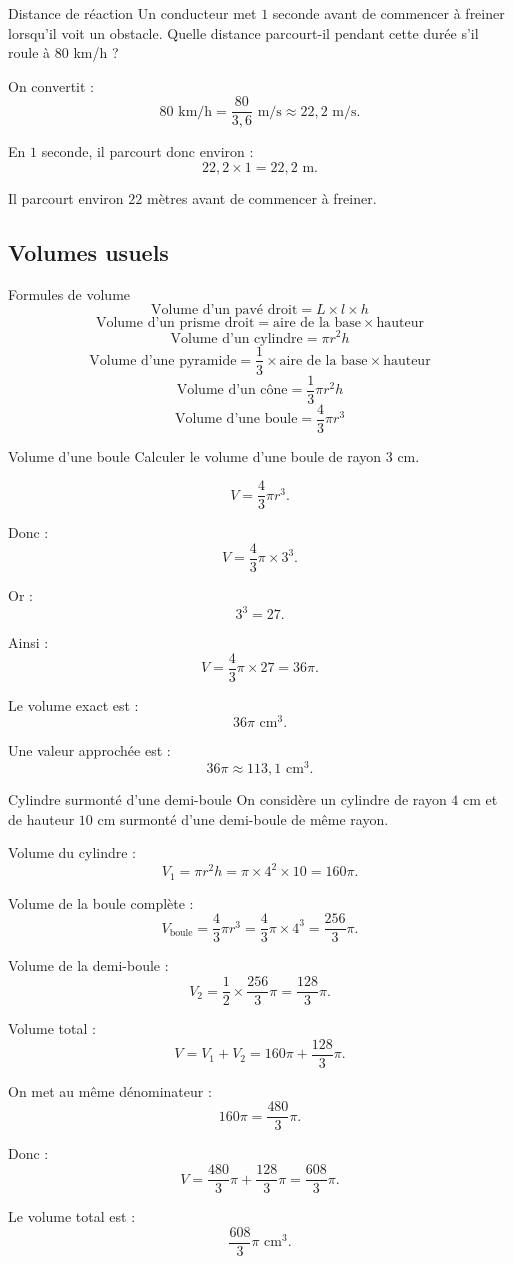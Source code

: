 \documentclass[11pt,a4paper]{article}
\begin{document}
\begin{examplebox}{Distance de réaction}
Un conducteur met $1$ seconde avant de commencer à freiner lorsqu'il voit un obstacle. Quelle distance parcourt-il pendant cette durée s'il roule à $80$ km/h ?

On convertit :
\[
80\text{ km/h}=\frac{80}{3{,}6}\text{ m/s}\approx 22{,}2\text{ m/s}.
\]

En $1$ seconde, il parcourt donc environ :
\[
22{,}2\times 1=22{,}2\text{ m}.
\]

Il parcourt environ $22$ mètres avant de commencer à freiner.
\end{examplebox}

\subsection{Volumes usuels}

\begin{retenirbox}{Formules de volume}
\[
\text{Volume d'un pavé droit}=L\times l\times h
\]
\[
\text{Volume d'un prisme droit}=\text{aire de la base}\times \text{hauteur}
\]
\[
\text{Volume d'un cylindre}=\pi r^2 h
\]
\[
\text{Volume d'une pyramide}=\frac{1}{3}\times \text{aire de la base}\times \text{hauteur}
\]
\[
\text{Volume d'un cône}=\frac{1}{3}\pi r^2 h
\]
\[
\text{Volume d'une boule}=\frac{4}{3}\pi r^3
\]
\end{retenirbox}

\begin{examplebox}{Volume d'une boule}
Calculer le volume d'une boule de rayon $3$ cm.

\[
V=\frac{4}{3}\pi r^3.
\]

Donc :
\[
V=\frac{4}{3}\pi \times 3^3.
\]

Or :
\[
3^3=27.
\]

Ainsi :
\[
V=\frac{4}{3}\pi \times 27=36\pi.
\]

Le volume exact est :
\[
36\pi\text{ cm}^3.
\]

Une valeur approchée est :
\[
36\pi\approx 113{,}1\text{ cm}^3.
\]
\end{examplebox}

\begin{examplebox}{Cylindre surmonté d'une demi-boule}
On considère un cylindre de rayon $4$ cm et de hauteur $10$ cm surmonté d'une demi-boule de même rayon.

Volume du cylindre :
\[
V_1=\pi r^2h=\pi\times 4^2\times 10=160\pi.
\]

Volume de la boule complète :
\[
V_{\text{boule}}=\frac{4}{3}\pi r^3=\frac{4}{3}\pi\times 4^3
=\frac{256}{3}\pi.
\]

Volume de la demi-boule :
\[
V_2=\frac{1}{2}\times \frac{256}{3}\pi=\frac{128}{3}\pi.
\]

Volume total :
\[
V=V_1+V_2=160\pi+\frac{128}{3}\pi.
\]

On met au même dénominateur :
\[
160\pi=\frac{480}{3}\pi.
\]

Donc :
\[
V=\frac{480}{3}\pi+\frac{128}{3}\pi=\frac{608}{3}\pi.
\]

Le volume total est :
\[
\frac{608}{3}\pi\text{ cm}^3.
\]
\end{examplebox}
\end{document}
